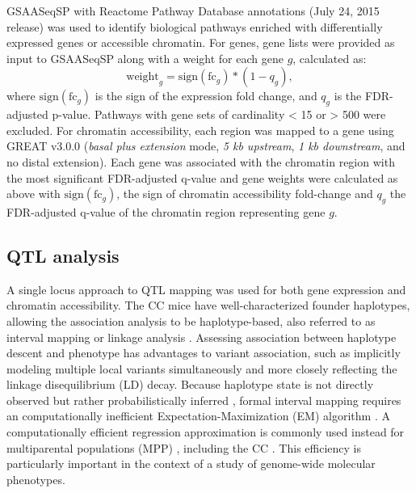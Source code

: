 GSAASeqSP \citep{Xiong2014} with Reactome Pathway Database annotations (July 24, 2015 release) was used to identify biological pathways enriched with differentially expressed genes or accessible chromatin. For genes, gene lists were provided as input to GSAASeqSP along with a weight for each gene $g$, calculated as:
\begin{equation}
\text{weight}_{g} = \text{sign}(\text{fc}_{g}) * (1-q_{g}),
\label{eq:gene_weighting}
\end{equation}
where $\text{sign}(\text{fc}_{g})$ is the sign of the expression fold change, and $q_{g}$ is the FDR-adjusted p-value. Pathways with gene sets of cardinality < 15 or > 500 were excluded. For chromatin accessibility, each region was mapped to a gene using GREAT v3.0.0 (\textit{basal plus extension} mode, \textit{5 kb upstream}, \textit{1 kb downstream}, and no distal extension). Each gene was associated with the chromatin region with the most significant FDR-adjusted q-value and gene weights were calculated as above with $\text{sign}(\text{fc}_{g})$, the sign of chromatin accessibility fold-change and $q_{g}$ the FDR-adjusted q-value of the chromatin region representing gene $g$.

\subsection{QTL analysis}

A single locus approach to QTL mapping was used for both gene expression and chromatin accessibility. The CC mice have well-characterized founder haplotypes, allowing the association analysis to be haplotype-based, also referred to as interval mapping or linkage analysis \citep{Lander1989}. Assessing association between haplotype descent and phenotype has advantages to variant association, such as implicitly modeling multiple local variants simultaneously and more closely reflecting the linkage disequilibrium (LD) decay. Because haplotype state is not directly observed but rather probabilistically inferred \citep{Lander1987,Mott2000,Liu2010,Fu2012,Gatti2014,Zheng2015}, formal interval mapping requires an computationally inefficient Expectation-Maximization (EM) algorithm \citep{Dempster1977}. A computationally efficient regression approximation \citep{Haley1992,Martinez1992} is commonly used instead for multiparental populations (MPP) \citep{Valdar2006a,Valdar2009,Svenson2012,Baud2013,Baud2014}, including the CC \citep{Aylor2011,Kelada2016,Mosedale2017,Donoghue2017}. This efficiency is particularly important in the context of a study of genome-wide molecular phenotypes.

